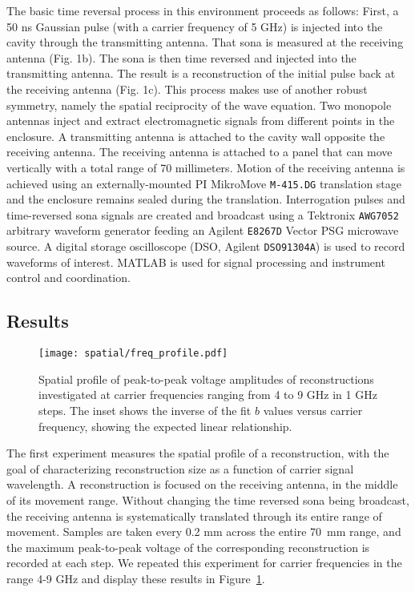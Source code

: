 The basic time reversal process in this environment proceeds as follows: First, a 50 ns Gaussian pulse (with a carrier frequency of 5 GHz) is injected into the cavity through the transmitting antenna. That sona is measured at the receiving antenna (Fig. 1b). The sona is then time reversed and injected into the transmitting antenna. The result is a reconstruction of the initial pulse back at the receiving antenna (Fig. 1c). This process makes use of another robust symmetry, namely the spatial reciprocity of the wave equation.
Two monopole antennas inject and extract electromagnetic signals from different points in the enclosure. A transmitting antenna is attached to the cavity wall opposite the receiving antenna. The receiving antenna is attached to a panel that can move vertically with a total range of 70 millimeters. Motion of the receiving antenna is achieved using an externally-mounted PI MikroMove \texttt{M-415.DG} translation stage and the enclosure remains sealed during the translation. Interrogation pulses and time-reversed sona signals are created and broadcast using a Tektronix \texttt{AWG7052} arbitrary waveform generator feeding an Agilent \texttt{E8267D} Vector PSG microwave source. A digital storage oscilloscope (DSO, Agilent \texttt{DSO91304A}) is used to record waveforms of interest. MATLAB is used for signal processing and instrument control and coordination.

\subsection{Results}

\begin{figure}[t!]
\texttt{[image: spatial/freq\_profile.pdf]}
\caption{Spatial profile of peak-to-peak voltage amplitudes of reconstructions
investigated at carrier frequencies ranging from 4 to 9 GHz in 1 GHz
steps.  The inset shows the inverse of the fit $b$ values versus carrier frequency, showing the expected linear relationship.}
\label{fig:spatial-freq-profile}
\end{figure}

The first experiment measures the spatial profile of a reconstruction, with the goal of characterizing reconstruction size as a function of carrier signal wavelength. A reconstruction is focused on the receiving antenna, in the middle of its movement range. Without changing the time reversed sona being broadcast, the receiving antenna is systematically translated through its entire range of movement. Samples are taken every 0.2 mm across the entire 70~mm range, and the maximum peak-to-peak voltage of the corresponding reconstruction is recorded at each step. We repeated this experiment for carrier frequencies in the range 4-9 GHz and display these results in Figure~\ref{fig:spatial-freq-profile}.

